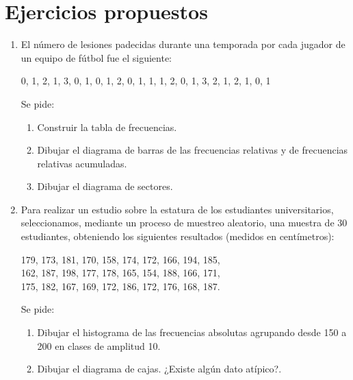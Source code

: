 \section{Ejercicios propuestos}
\begin{enumerate}[leftmargin=*]

\item  El número de lesiones padecidas durante una temporada por cada jugador de un equipo de fútbol fue el siguiente:
\begin{center}
0, 1, 2, 1, 3, 0, 1, 0, 1, 2, 0, 1, 1, 1, 2, 0, 1, 3, 2, 1, 2, 1, 0, 1
\end{center}

Se pide:
\begin{enumerate}
\item Construir la tabla de frecuencias.
\item Dibujar el diagrama de barras de las frecuencias relativas y de frecuencias relativas acumuladas.
\item Dibujar el diagrama de sectores.
\end{enumerate}

\item Para realizar un estudio sobre la estatura de los estudiantes universitarios, seleccionamos, mediante un proceso
de muestreo aleatorio, una muestra de 30 estudiantes, obteniendo los siguientes resultados (medidos en centímetros):
\begin{center}
179, 173, 181, 170, 158, 174, 172, 166, 194, 185,\\
162, 187, 198, 177, 178, 165, 154, 188, 166, 171,\\
175, 182, 167, 169, 172, 186, 172, 176, 168, 187.
\end{center}

Se pide:
\begin{enumerate}
\item  Dibujar el histograma de las frecuencias absolutas agrupando desde 150 a 200 en clases de amplitud 10.
\item  Dibujar el diagrama de cajas. ¿Existe algún dato atípico?.
\end{enumerate}

\end{enumerate}
